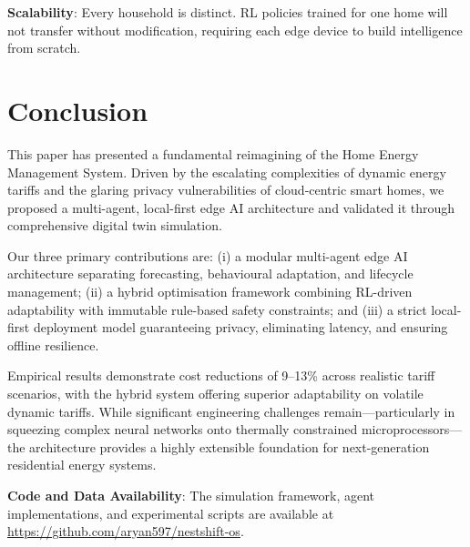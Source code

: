 \documentclass[11pt,a4paper]{article}
\begin{document}
\textbf{Scalability}: Every household is distinct. RL policies trained for one home will not transfer without modification, requiring each edge device to build intelligence from scratch.

\section{Conclusion}

This paper has presented a fundamental reimagining of the Home Energy Management System. Driven by the escalating complexities of dynamic energy tariffs and the glaring privacy vulnerabilities of cloud-centric smart homes, we proposed a multi-agent, local-first edge AI architecture and validated it through comprehensive digital twin simulation.

Our three primary contributions are: (i) a modular multi-agent edge AI architecture separating forecasting, behavioural adaptation, and lifecycle management; (ii) a hybrid optimisation framework combining RL-driven adaptability with immutable rule-based safety constraints; and (iii) a strict local-first deployment model guaranteeing privacy, eliminating latency, and ensuring offline resilience.

Empirical results demonstrate cost reductions of 9--13\% across realistic tariff scenarios, with the hybrid system offering superior adaptability on volatile dynamic tariffs. While significant engineering challenges remain---particularly in squeezing complex neural networks onto thermally constrained microprocessors---the architecture provides a highly extensible foundation for next-generation residential energy systems.

\vspace{1em}
\noindent\textbf{Code and Data Availability}: The simulation framework, agent implementations, and experimental scripts are available at \url{https://github.com/aryan597/nestshift-os}.
\end{document}
